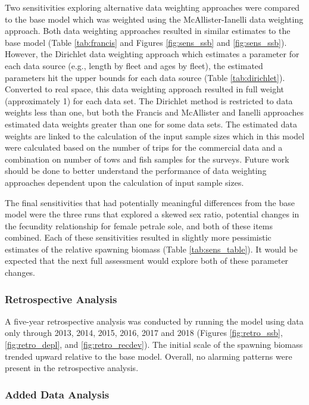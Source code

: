 \documentclass[12pt,]{article}
\begin{document}
Two sensitivities exploring alternative data weighting approaches were
compared to the base model which was weighted using the
McAllister-Ianelli data weighting approach. Both data weighting
approaches resulted in similar estimates to the base model (Table
\ref{tab:francis} and Figures \ref{fig:sens_ssb} and
\ref{fig:sens_ssb}). However, the Dirichlet data weighting approach
which estimates a parameter for each data source (e.g., length by fleet
and ages by fleet), the estimated parameters hit the upper bounds for
each data source (Table \ref{tab:dirichlet}). Converted to real space,
this data weighting approach resulted in full weight (approximately 1)
for each data set. The Dirichlet method is restricted to data weights
less than one, but both the Francis and McAllister and Ianelli
approaches estimated data weights greater than one for some data sets.
The estimated data weights are linked to the calculation of the input
sample sizes which in this model were calculated based on the number of
trips for the commercial data and a combination on number of tows and
fish samples for the surveys. Future work should be done to better
understand the performance of data weighting approaches dependent upon
the calculation of input sample sizes.

The final sensitivities that had potentially meaningful differences from
the base model were the three runs that explored a skewed sex ratio,
potential changes in the fecundity relationship for female petrale sole,
and both of these items combined. Each of these sensitivities resulted
in slightly more pessimistic estimates of the relative spawning biomass
(Table \ref{tab:sens_table}). It would be expected that the next full
assessment would explore both of these parameter changes.

\subsubsection{Retrospective Analysis}\label{retrospective-analysis}

A five-year retrospective analysis was conducted by running the model
using data only through 2013, 2014, 2015, 2016, 2017 and 2018 (Figures
\ref{fig:retro_ssb}, \ref{fig:retro_depl}, and \ref{fig:retro_recdev}).
The initial scale of the spawning biomass trended upward relative to the
base model. Overall, no alarming patterns were present in the
retrospective analysis.

\subsubsection{Added Data Analysis}\label{added-data-analysis}
\end{document}
